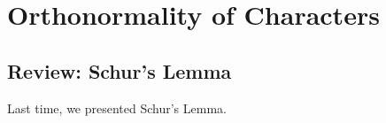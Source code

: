 










\section{Orthonormality of Characters}

\subsection{Review: Schur's Lemma}

Last time, we presented Schur's Lemma.

